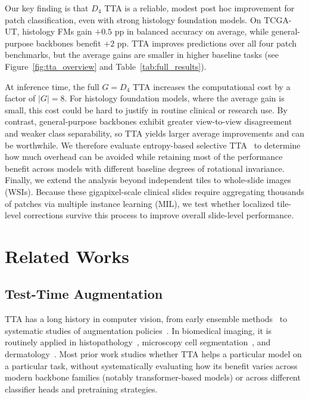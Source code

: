 \documentclass{melba}
\begin{document}
Our key finding is that $D_4$ TTA is a reliable, modest post hoc improvement for patch classification, even with strong histology foundation models. On TCGA-UT, histology FMs gain $+0.5$ pp in balanced accuracy on average, while general-purpose backbones benefit $+2$ pp. TTA improves predictions over all four patch benchmarks, but the average gains are smaller in higher baseline tasks (see Figure~\ref{fig:tta_overview} and Table~\ref{tab:full_results}).

At inference time, the full $G=D_4$ TTA increases the computational cost by a factor of $|G|=8$. For histology foundation models, where the average gain is small, this cost could be hard to justify in routine clinical or research use. By contrast, general-purpose backbones exhibit greater view-to-view disagreement and weaker class separability, so TTA yields larger average improvements and can be worthwhile. We therefore evaluate entropy-based selective TTA~\citep{son2023efficient} to determine how much overhead can be avoided while retaining most of the performance benefit across models with different baseline degrees of rotational invariance. Finally, we extend the analysis beyond independent tiles to whole-slide images (WSIs). Because these gigapixel-scale clinical slides require aggregating thousands of patches via multiple instance learning (MIL), we test whether localized tile-level corrections survive this process to improve overall slide-level performance.

\section{Related Works}
\label{sec:related}

\subsection{Test-Time Augmentation}

TTA has a long history in computer vision, from early ensemble methods~\citep{krizhevsky2012imagenet} to systematic studies of augmentation policies~\citep{shanmugam2021better,kimTTAsurvey2020}. In biomedical imaging, it is routinely applied in histopathology~\citep{tellez2019quantifying,wang2016mitosis}, microscopy cell segmentation~\citep{moshkov2020test}, and dermatology~\citep{perez2018data}. Most prior work studies whether TTA helps a particular model on a particular task, without systematically evaluating how its benefit varies across modern backbone families (notably transformer-based models) or across different classifier heads and pretraining strategies.
\end{document}

